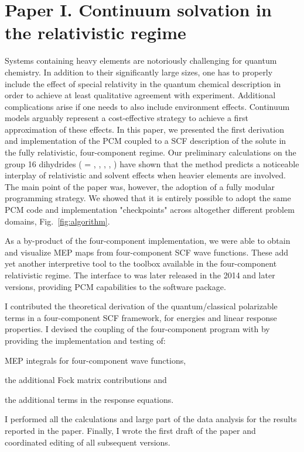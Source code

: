\section*{Paper I. Continuum solvation in the relativistic regime}

Systems containing heavy elements are notoriously challenging for quantum chemistry.
In addition to their significantly large sizes, one has to properly include the
effect of special relativity in the quantum chemical description in order to
achieve at least qualitative agreement with experiment.
Additional complications arise if one needs to also include environment effects.
Continuum models arguably represent a cost-effective strategy to achieve a first
approximation of these effects.
In this paper, we presented the first derivation and implementation of the \acs{PCM}
coupled to a \acs{SCF} description of the solute in the fully relativistic, four-component
regime.
Our preliminary calculations on the group 16 dihydrides  ( =
, , , , ) have shown that the method predicts
a noticeable interplay of relativistic and solvent effects when heavier
elements are involved.
The main point of the paper was, however, the adoption of a fully modular
programming strategy. We showed that it is entirely possible to adopt the same
\acs{PCM} code and implementation "checkpoints" across altogether different
problem domains, Fig.~\ref{fig:algorithm}.

As a by-product of the four-component implementation, we were able to obtain and visualize \acs{MEP} maps
from four-component \acs{SCF} wave functions. These add yet another interpretive tool to the toolbox available
in the four-component relativistic regime.
The interface to \DIRAC was later released in the 2014 and later versions,
providing \acs{PCM} capabilities to the software package.

I contributed the theoretical derivation of the quantum/classical polarizable
terms in a four-component \acs{SCF} framework, for energies and linear response
properties. I devised the coupling of the four-component program \DIRAC with
\pcmsolver by providing the implementation and testing of:
\begin{enumerate*}[label={\alph*)},font={\color{PMS1797}}]
  \item \acs{MEP} integrals for four-component wave functions,
  \item the additional Fock matrix contributions and
  \item the additional terms in the response equations.
\end{enumerate*}
I performed all the calculations and large part of the data analysis
for the results reported in the paper.
Finally, I wrote the first draft of the paper and coordinated editing of
all subsequent versions.


